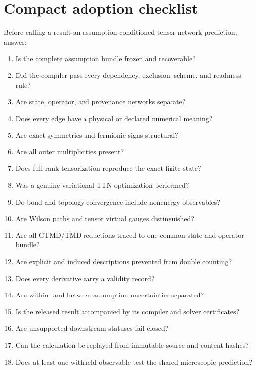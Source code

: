 \documentclass[11pt]{article}
\begin{document}
\section{Compact adoption checklist}
\label{app:checklist}

Before calling a result an assumption-conditioned tensor-network prediction,
answer:
\begin{enumerate}
 \item Is the complete assumption bundle frozen and recoverable?
 \item Did the compiler pass every dependency, exclusion, scheme, and readiness
 rule?
 \item Are state, operator, and provenance networks separate?
 \item Does every edge have a physical or declared numerical meaning?
 \item Are exact symmetries and fermionic signs structural?
 \item Are all outer multiplicities present?
 \item Does full-rank tensorization reproduce the exact finite state?
 \item Was a genuine variational TTN optimization performed?
 \item Do bond and topology convergence include nonenergy observables?
 \item Are Wilson paths and tensor virtual gauges distinguished?
 \item Are all GTMD/TMD reductions traced to one common state and operator
 bundle?
 \item Are explicit and induced descriptions prevented from double counting?
 \item Does every derivative carry a validity record?
 \item Are within- and between-assumption uncertainties separated?
 \item Is the released result accompanied by its compiler and solver
 certificates?
 \item Are unsupported downstream statuses fail-closed?
 \item Can the calculation be replayed from immutable source and content hashes?
 \item Does at least one withheld observable test the shared microscopic
 prediction?
\end{enumerate}
\end{document}

